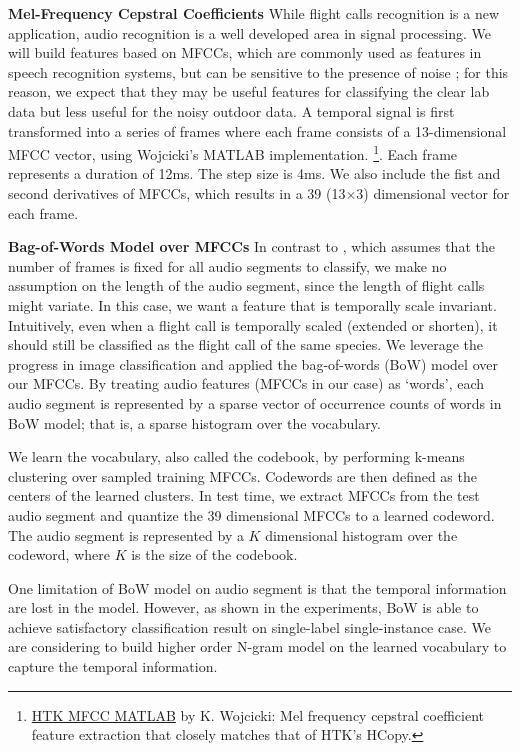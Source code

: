 \documentclass[12pt,peerreview,letterpaper]{IEEEtran}
\begin{document}
\textbf{Mel-Frequency Cepstral Coefficients}
While flight calls recognition is a new application, audio recognition is a well developed area in signal processing. We will build features based on MFCCs, which are commonly used as features in speech recognition systems, but can be sensitive to the presence of noise \cite{tyagi2005desensitizing}; for this reason, we expect that they may be
useful features for classifying the clear lab data but less useful for the noisy outdoor data. A temporal signal is first transformed into a series of frames where each frame consists of a 13-dimensional MFCC vector, using Wojcicki's MATLAB
implementation. \footnote{\scriptsize \href{http://www.mathworks.com/matlabcentral/fileexchange/32849-htk-mfcc-matlab/content/mfcc/mfcc.m}{HTK MFCC MATLAB} by K. Wojcicki: Mel frequency cepstral coefficient feature extraction that closely matches that of HTK's HCopy.}. Each frame represents a duration of 12ms. The step size is 4ms. We also include the fist and second derivatives of MFCCs, which results in a 39 (13$\times$3) dimensional vector for each frame.

\textbf{Bag-of-Words Model over MFCCs}
\label{sec:bow}
In contrast to \cite{Dufour_NIPSW13}, which assumes that the number of frames is fixed for all audio segments to classify, we make no assumption on the length of the audio segment, since the length of flight calls might variate. In this case, we want a feature that is temporally scale invariant. Intuitively, even when a flight call is temporally scaled (extended or shorten), it should still be classified as the flight call of the same species. We leverage the progress in image classification and applied the bag-of-words (BoW) model \cite{Li_CVPR05} over our MFCCs. By treating audio features (MFCCs in our case) as `words', each audio segment is represented by a sparse vector of occurrence counts of words in BoW model; that is, a sparse histogram over the vocabulary.

We learn the vocabulary, also called the codebook, by performing k-means clustering over sampled training MFCCs. Codewords are then defined as the centers of the learned clusters. In test time, we extract MFCCs from the test audio segment and quantize the 39 dimensional MFCCs to a learned codeword. The audio segment is represented by a $K$ dimensional histogram over the codeword, where $K$ is the size of the codebook.

One limitation of BoW model on audio segment is that the temporal information are lost in the model. However, as shown in the experiments, BoW is able to achieve satisfactory classification result on single-label single-instance case. We are considering to build higher order N-gram model on the learned vocabulary to capture the temporal information.
\end{document}
